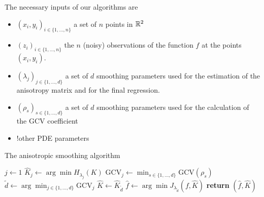 The necessary inputs of our algorithms are

\begin{itemize}
	\item $(x_i,y_i)_{i\in\{1,\hdots,n\}}$	a set of $n$ points in $\mathbb{R}^2$
	\item $(z_i)_{i\in\{1,\hdots,n\}}$	the $n$ (noisy) observations of the function $f$ at the points $(x_i,y_i)$.
	\item $(\lambda_j)_{j\in\{1,\hdots,d\}}$	a set of $d$ smoothing parameters used for the estimation of the anisotropy matrix and for the final regression.
	\item $(\rho_s)_{s\in\{1,\hdots,d\}}$	a set of $d$ smoothing parameters used for the calculation of the GCV coefficient
	\item !other PDE parameters
\end{itemize}

\begin{algorithm}
	\caption{The anisotropic smoothing algorithm}\label{algo:aniso}
	\begin{algorithmic}[1]
		\State $j\gets 1$
    		\State $\hat{K}_j\gets\arg\min H_{\lambda_j}(K)$ \label{lst:K}
			\State $\text{GCV}_j \gets \min_{s\in\{1,\hdots,d\}} \text{GCV}(\rho_s)$
    	\EndFor
		\State $\tilde{d} \gets \arg\min_{j\in\{1,\hdots,d\}} \text{GCV}_j$
		\State $\hat{K} \gets \hat{K}_{\tilde{d}}$
		\State $\hat{f} \gets \arg\min J_{ \lambda_{\tilde{d}} }(f,\hat{K})$
		\State \textbf{return} $(\hat{f},\hat{K})$
		\EndProcedure
	\end{algorithmic}
\end{algorithm}


